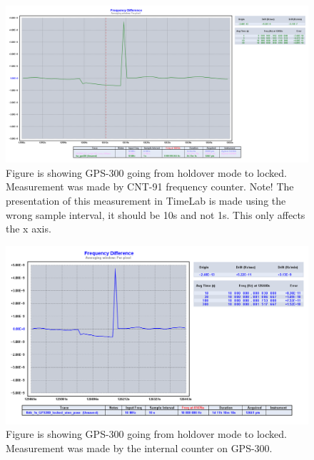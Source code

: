 \documentclass[11pt,english,a4paper]{article}
\begin{document}
\begin{figure}[!htb]
  \centering
    \includegraphics[width=1\textwidth]{del_2_spm3_fra_holdover_to_locked.png}
      \caption{Figure is showing GPS-300 going from holdover mode to locked. Measurement was made by CNT-91 frequency counter. Note! The presentation of this measurement in TimeLab is made using the wrong sample interval, it should be 10s and not 1s. This only affects the x axis.}
          \label{fig:del_2_spm3_fra_holdover_to_locked}
\end{figure}

\begin{figure}[!htb]
  \centering
    \includegraphics[width=1\textwidth]{del_2_spm3_fra_holdover_to_locked_z38.png}
      \caption{Figure is showing GPS-300 going from holdover mode to locked. Measurement was made by the internal counter on GPS-300.}
          \label{fig:del_2_spm3_fra_holdover_to_locked_z38}
\end{figure}
\end{document}
